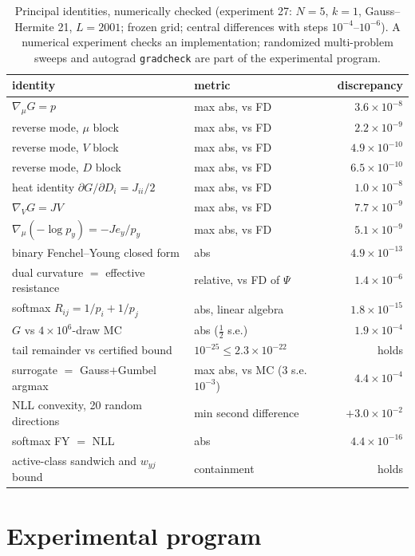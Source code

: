 \documentclass[11pt]{article}
\theoremstyle{remark}
\begin{document}
\begin{table}[t]
\centering
\small
\begin{tabular}{llr}
\toprule
identity & metric & discrepancy \\
\midrule
$\nabla_\mu G = p$ & max abs, vs FD & $3.6\times10^{-8}$ \\
reverse mode, $\mu$ block & max abs, vs FD & $2.2\times10^{-9}$ \\
reverse mode, $V$ block & max abs, vs FD & $4.9\times10^{-10}$ \\
reverse mode, $D$ block & max abs, vs FD & $6.5\times10^{-10}$ \\
heat identity $\partial G/\partial D_i = J_{ii}/2$ & max abs, vs FD & $1.0\times10^{-8}$ \\
$\nabla_V G = JV$ & max abs, vs FD & $7.7\times10^{-9}$ \\
$\nabla_\mu(-\log p_y) = -J e_y / p_y$ & max abs, vs FD & $5.1\times10^{-9}$ \\
binary Fenchel--Young closed form & abs & $4.9\times10^{-13}$ \\
dual curvature $=$ effective resistance & relative, vs FD of $\Psi$ & $1.4\times10^{-6}$ \\
softmax $R_{ij} = 1/p_i + 1/p_j$ & abs, linear algebra & $1.8\times10^{-15}$ \\
$G$ vs $4\times10^6$-draw MC & abs ($\tfrac12$ s.e.) & $1.9\times10^{-4}$ \\
tail remainder vs certified bound & $10^{-25} \le 2.3\times10^{-22}$ & holds \\
surrogate $=$ Gauss$+$Gumbel argmax & max abs, vs MC ($3$ s.e.\ $10^{-3}$) & $4.4\times10^{-4}$ \\
NLL convexity, 20 random directions & min second difference & $+3.0\times10^{-2}$ \\
softmax FY $=$ NLL & abs & $4.4\times10^{-16}$ \\
active-class sandwich and $w_{yj}$ bound & containment & holds \\
\bottomrule
\end{tabular}
\caption{Principal identities, numerically checked (experiment 27:
$N=5$, $k=1$, Gauss--Hermite 21, $L=2001$; frozen grid; central
differences with steps $10^{-4}$--$10^{-6}$). A numerical experiment
checks an implementation; randomized multi-problem sweeps and autograd
\texttt{gradcheck} are part of the experimental program.}
\label{tab:identities}
\end{table}

\section{Experimental program}\label{sec:program}
\end{document}

